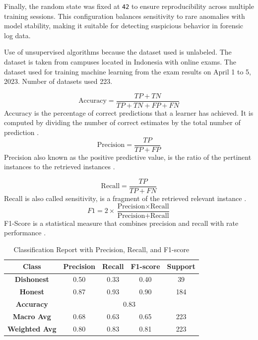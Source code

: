 Finally, the random state was fixed at \texttt{42} to ensure reproducibility across multiple training sessions. This configuration balances sensitivity to rare anomalies with model stability, making it suitable for detecting suspicious behavior in forensic log data.


Use of unsupervised algorithms because the dataset used is unlabeled. The dataset is taken from campuses located in Indonesia with online exams. The dataset used for training machine learning from the exam results on April 1 to 5, 2023. Number of datasets used 223.

\begin{equation}
	\text{Accuracy} = \frac{TP + TN}{TP + TN + FP + FN}
\end{equation}
Accuracy is the percentage of correct predictions that a learner has achieved. It is computed by dividing the number of correct estimates by the total number of prediction \citet{smirani2022algorithm}.
\begin{equation}
	\text{Precision} = \frac{TP}{TP + FP}
\end{equation}
Precision also known as the positive predictive value, is the ratio of the pertinent instances to the retrieved instances \citet{smirani2022algorithm}.

\begin{equation}
	\text{Recall} = \frac{TP}{TP + FN}
\end{equation}
Recall is also called sensitivity, is a fragment of the retrieved relevant instance \citet{smirani2022algorithm}.
\begin{equation}
	F1 = 2 \times \frac{\text{Precision} \times \text{Recall}}{\text{Precision} + \text{Recall}}
\end{equation}
F1-Score is a statistical measure that combines precision and recall with rate performance \citet{smirani2022algorithm}.

\begin{table}[H]
	\centering
	\renewcommand{\arraystretch}{1.3} %
	\caption{Classification Report with Precision, Recall, and F1-score}
	\begin{tabular}{|c|c|c|c|c|}
		\hline
		\textbf{Class} & \textbf{Precision} & \textbf{Recall} & \textbf{F1-score} & \textbf{Support} \\
		\hline
		\textbf{Dishonest} & 0.50 & 0.33 & 0.40 & 39 \\
		\textbf{Honest}  & 0.87 & 0.93 & 0.90 & 184 \\
		\hline
		\textbf{Accuracy}  & \multicolumn{4}{c|}{0.83} \\
		\hline
		\textbf{Macro Avg} & 0.68 & 0.63 & 0.65 & 223 \\
		\textbf{Weighted Avg} & 0.80 & 0.83 & 0.81 & 223 \\
		\hline
	\end{tabular}
	\label{tab:classification_report}
\end{table}

